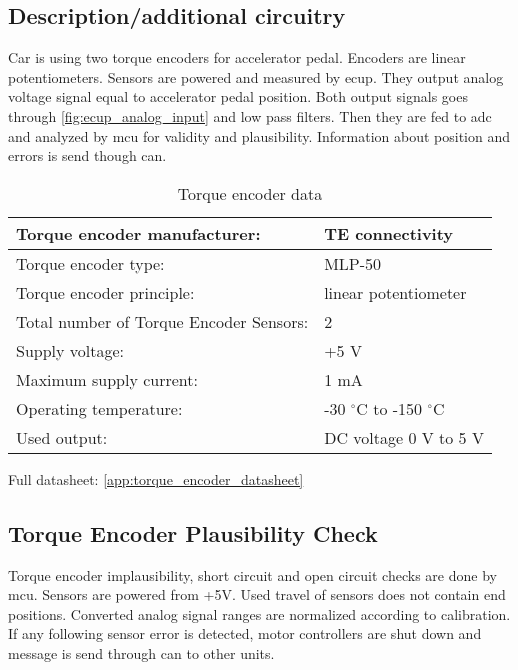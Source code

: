 \subsection{Description/additional circuitry}
Car is using two torque encoders for accelerator pedal. Encoders are linear potentiometers. Sensors are powered and measured by \gls{ecup}. They output analog voltage signal equal to accelerator pedal position. Both output signals goes through \ref{fig:ecup_analog_input} and low pass filters. Then they are fed to \gls{adc} and analyzed by \gls{mcu} for validity and plausibility. Information about position and errors is send though \gls{can}.

\begin{table}[H]
	\centering
	\caption{Torque encoder data}
	\begin{tabularx}{\textwidth}{|X|X|}
		\hline
		Torque encoder manufacturer: & TE connectivity  \\[\TableSize]\hline
		Torque encoder type: & MLP-50  \\[\TableSize]\hline
		Torque encoder principle: & linear potentiometer  \\[\TableSize]\hline
		Total number of Torque Encoder Sensors: & 2  \\[\TableSize]\hline
		Supply voltage: & +5 V  \\[\TableSize]\hline
		Maximum supply current: & 1 mA  \\[\TableSize]\hline
		Operating temperature: & -30 $^\circ$C to -150 $^\circ$C  \\[\TableSize]\hline
		Used output: & DC voltage 0 V to 5 V\\[\TableSize]\hline
	\end{tabularx}%
	\label{tab:encoder-general}%
\end{table}%

Full datasheet: \ref{app:torque_encoder_datasheet}

\subsection{Torque Encoder Plausibility Check}
Torque encoder implausibility, short circuit and open circuit checks are done by \gls{mcu}. Sensors are powered from +5V. Used travel of sensors does not contain end positions. Converted analog signal ranges are normalized according to calibration.
If any following sensor error is detected, motor controllers are shut down and message is send through \gls{can} to other units.

